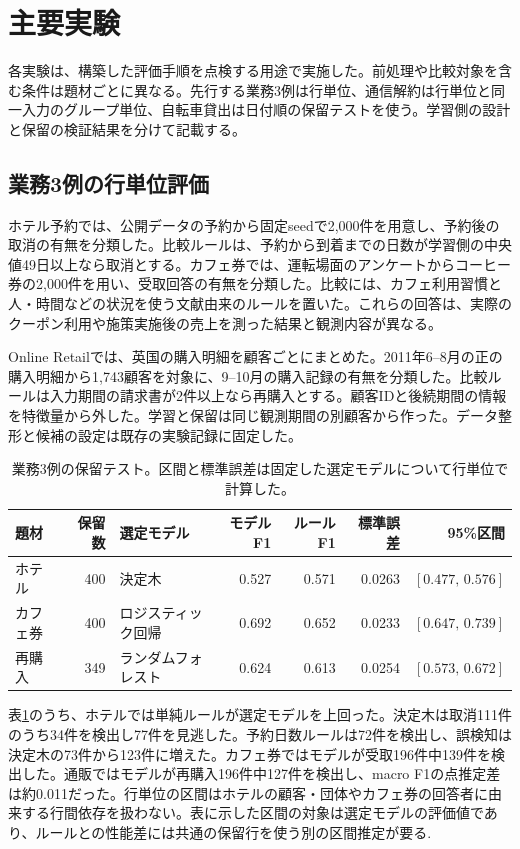 \section{主要実験}\label{sec:experiments}

各実験は、構築した評価手順を点検する用途で実施した。前処理や比較対象を含む条件は題材ごとに異なる。先行する業務3例は行単位、通信解約は行単位と同一入力のグループ単位、自転車貸出は日付順の保留テストを使う。学習側の設計と保留の検証結果を分けて記載する。

\subsection{業務3例の行単位評価}

ホテル予約\cite{hoteldata}では、公開データの予約から固定seedで2,000件を用意し、予約後の取消の有無を分類した。比較ルールは、予約から到着までの日数が学習側の中央値49日以上なら取消とする。カフェ券\cite{coupondata,wang}では、運転場面のアンケートからコーヒー券の2,000件を用い、受取回答の有無を分類した。比較には、カフェ利用習慣と人・時間などの状況を使う文献由来のルールを置いた。これらの回答は、実際のクーポン利用や施策実施後の売上を測った結果と観測内容が異なる。

Online Retail\cite{retaildata}では、英国の購入明細を顧客ごとにまとめた。2011年6--8月の正の購入明細から1,743顧客を対象に、9--10月の購入記録の有無を分類した。比較ルールは入力期間の請求書が2件以上なら再購入とする。顧客IDと後続期間の情報を特徴量から外した。学習と保留は同じ観測期間の別顧客から作った。データ整形と候補の設定は既存の実験記録に固定した\cite{business}。

\begin{table}[htbp]
\centering
\small
\caption{業務3例の保留テスト。区間と標準誤差は固定した選定モデルについて行単位で計算した。}
\label{tab:business}
\begin{tabular}{@{}lrlrrrr@{}}
\toprule
題材 & 保留数 & 選定モデル & モデルF1 & ルールF1 & 標準誤差 & 95\%区間 \\
\midrule
ホテル & 400 & 決定木 & 0.527 & 0.571 & 0.0263 & $[0.477,\,0.576]$\\
カフェ券 & 400 & ロジスティック回帰 & 0.692 & 0.652 & 0.0233 & $[0.647,\,0.739]$\\
再購入 & 349 & ランダムフォレスト & 0.624 & 0.613 & 0.0254 & $[0.573,\,0.672]$\\
\bottomrule
\end{tabular}
\end{table}

表\ref{tab:business}のうち、ホテルでは単純ルールが選定モデルを上回った。決定木は取消111件のうち34件を検出し77件を見逃した。予約日数ルールは72件を検出し、誤検知は決定木の73件から123件に増えた。カフェ券ではモデルが受取196件中139件を検出した。通販ではモデルが再購入196件中127件を検出し、macro F1の点推定差は約0.011だった。行単位の区間はホテルの顧客・団体やカフェ券の回答者に由来する行間依存を扱わない。表に示した区間の対象は選定モデルの評価値であり、ルールとの性能差には共通の保留行を使う別の区間推定が要る\cite{business,metricunc}.

